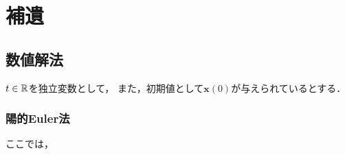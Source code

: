 \chapter{補遺}
\label{chap:補遺}
\section{数値解法}
$t \in \mathbb{R}$を独立変数として，
また，初期値として$\bm{x}(0)$が与えられているとする．
\subsection{陽的Euler法}
ここでは，
